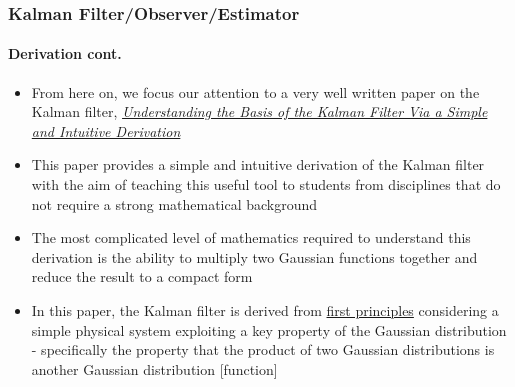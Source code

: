 \begin{frame}\pw\Large
\frametitle{Kalman Filter/Observer/Estimator}
\framesubtitle{Derivation \tiny cont.}
\begin{itemize}\scriptsize
\item From here on, we focus our attention to a very well written paper on the Kalman filter,   \href{http://www.cl.cam.ac.uk/~rmf25/papers/Understanding the Basis of the Kalman Filter.pdf}{\color{blue} \emph{Understanding the Basis of the Kalman Filter Via a Simple and Intuitive Derivation}} 
\item This paper provides a simple and intuitive derivation of the Kalman filter with the aim of teaching this useful tool to students from disciplines that do not require a strong mathematical background
\item The most complicated level of mathematics required to understand this derivation is the ability to multiply two Gaussian functions together and reduce the result to a compact form
\item In this paper, the Kalman filter is derived from \underline{first principles} considering a simple physical system exploiting a key property of the Gaussian distribution - specifically the property that the product of two Gaussian distributions is another Gaussian distribution [function]
\end{itemize}
\end{frame}



